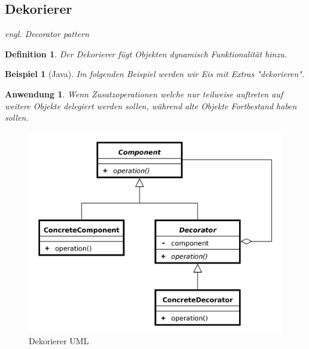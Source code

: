 \documentclass[a4paper]{article}
\theoremstyle{break}
\newtheorem{defi}{Definition}[section]
\newtheorem{ex}{Beispiel}[section]
\newtheorem{why}{Anwendung}[section]
\begin{document}
\newpage
\subsection{Dekorierer}

\textit{engl. Decorator pattern}

\begin{defi}
	Der Dekorierer fügt Objekten dynamisch Funktionalität hinzu.
\end{defi}

\begin{ex}[Java]
	Im folgenden Beispiel werden wir Eis mit Extras "dekorieren".
	
	
	
	
	
	
	
	
	
\end{ex}

\begin{why}
	Wenn Zusatzoperationen welche nur teilweise auftreten auf weitere Objekte delegiert werden sollen, während alte Objekte Fortbestand haben sollen.
\end{why}
\begin{figure}[H]
	\centering
	\includegraphics[width=\textwidth]{../diagrams/uml/DecoratorPattern.png}
	\caption{Dekorierer UML}
\end{figure}
\end{document}
